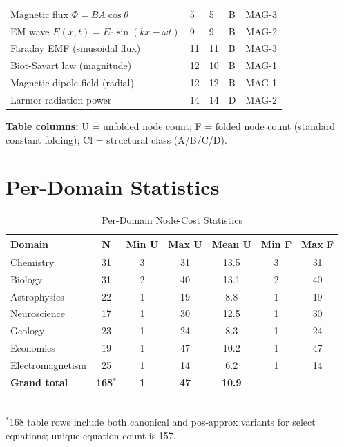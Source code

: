 \documentclass[12pt,a4paper]{article}
\theoremstyle{definition}
\begin{document}
\begin{center}
\begin{longtable}{L{4.4cm} C{0.7cm} C{0.7cm} C{0.5cm} L{2.6cm}}
Magnetic flux $\Phi=BA\cos\theta$   & 5  & 5  & B & MAG-3 \\
EM wave $E(x,t)=E_0\sin(kx-\omega t)$ & 9 & 9 & B & MAG-2 \\
Faraday EMF (sinusoidal flux)       & 11 & 11 & B & MAG-3 \\
Biot-Savart law (magnitude)         & 12 & 10 & B & MAG-1 \\
Magnetic dipole field (radial)      & 12 & 12 & B & MAG-1 \\
Larmor radiation power              & 14 & 14 & D & MAG-2 \\
\end{longtable}
\end{center}

\noindent\textbf{Table columns:}
U = unfolded node count; F = folded node count (standard constant folding);
Cl = structural class (A/B/C/D).

\section{Per-Domain Statistics}
\label{sec:stats}

\begin{table}[ht]
\centering
\caption{Per-Domain Node-Cost Statistics}
\label{tab:domain-stats}
\begin{tabular}{lcccccc}
\toprule
\textbf{Domain} & \textbf{N} & \textbf{Min U} & \textbf{Max U} & \textbf{Mean U} & \textbf{Min F} & \textbf{Max F} \\
\midrule
Chemistry        & 31 & 3  & 31 & 13.5 & 3  & 31 \\
Biology          & 31 & 2  & 40 & 13.1 & 2  & 40 \\
Astrophysics     & 22 & 1  & 19 & 8.8  & 1  & 19 \\
Neuroscience     & 17 & 1  & 30 & 12.5 & 1  & 30 \\
Geology          & 23 & 1  & 24 & 8.3  & 1  & 24 \\
Economics        & 19 & 1  & 47 & 10.2 & 1  & 47 \\
Electromagnetism & 25 & 1  & 14 & 6.2  & 1  & 14 \\
\midrule
\textbf{Grand total} & \textbf{168$^*$} & \textbf{1} & \textbf{47} & \textbf{10.9} & & \\
\bottomrule
\end{tabular}
\vspace{4pt}\\
\small $^*$168 table rows include both canonical and pos-approx variants for
select equations; unique equation count is 157.
\end{table}
\end{document}
